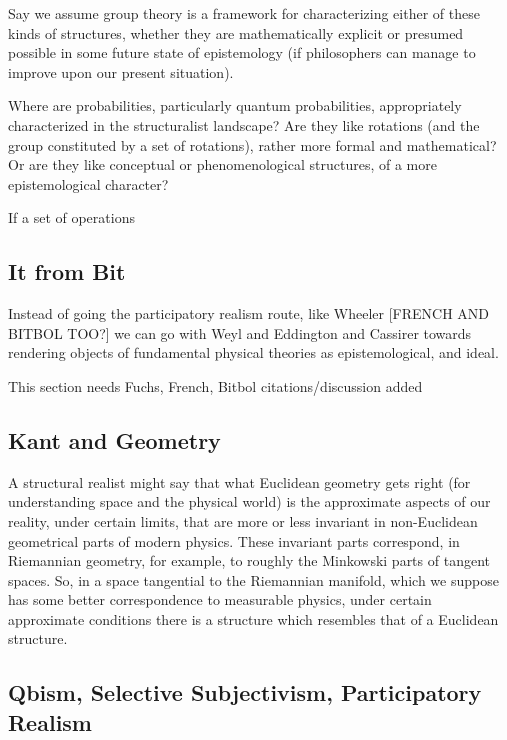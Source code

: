 Say we assume group theory is a framework for characterizing either of these kinds of structures, whether they are mathematically explicit or presumed possible in some future state of epistemology (if philosophers can manage to improve upon our present situation).

Where are probabilities, particularly quantum probabilities, appropriately characterized in the structuralist landscape?  Are they like rotations (and the group constituted by a set of rotations), rather more formal and mathematical?  Or are they like conceptual or phenomenological structures, of a more epistemological character?  

If a set of operations 






\subsection{It from Bit}

Instead of going the participatory realism route, like Wheeler [FRENCH AND BITBOL TOO?] we can go with Weyl and Eddington and Cassirer towards rendering objects of fundamental physical theories as epistemological, and ideal.

This section needs Fuchs, French, Bitbol citations/discussion added

\subsection{Kant and Geometry}

A structural realist might say that what Euclidean geometry gets right (for understanding space and the physical world) is the approximate aspects of our reality, under certain limits, that are more or less invariant in non-Euclidean geometrical parts of modern physics.  These invariant parts correspond, in Riemannian geometry, for example, to roughly the Minkowski parts of tangent spaces.  So, in a space tangential to the Riemannian manifold, which we suppose has some better correspondence to measurable physics, under certain approximate conditions there is a structure which resembles that of a Euclidean structure.







\subsection{Qbism, Selective Subjectivism, Participatory Realism}

